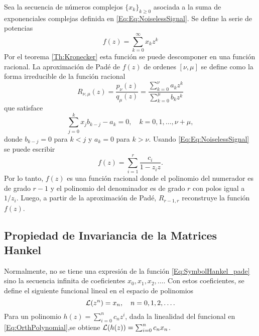             Sea la secuencia de números complejos $\big\{x_k\big\}_{k\ge 0}$ asociada a la suma de exponenciales complejas definida en \eqref{Eq:Eq:NoiselessSignal}. Se define la serie de potencias
            \begin{equation}
                f(z) = \sum_{k=0}^\infty x_kz^k
                \label{Eq:SymbolHankel_pade}
            \end{equation}
            Por el teorema \eqref{Th:Kronecker} esta función se puede descomponer en una función racional. La aproximación de Padé de $f(z)$ de ordenes $[\nu,\mu]$ se define como la forma irreducible de la función racional
		      \begin{equation}
		          R_{\nu,\mu}(z) = \frac{p_{\nu}(z)}{q_{\mu}(z)} =  \frac{\sum_{k=0}^{\nu}a_kz^k }{\sum_{k=0}^{\mu}b_kz^k}
		        \label{Eq:PadeApprox}
		      \end{equation} que satisface
		      \begin{equation}
		          \sum_{j=0}^{k}x_jb_{k-j}-a_k = 0, \quad k = 0,1,\ldots, \nu+\mu,
		          \label{Eq:PadeApprox1}
		      \end{equation}
		      donde $b_{k-j} = 0$ para $k<j$ y $a_k = 0$ para $k>\nu$. Usando
            \eqref{Eq:Eq:NoiselessSignal} se puede escribir
		      \begin{equation}
			         f(z) = \sum_{i=1}^r\frac{c_i}{1-z_iz}.
			         \label{Eq:PadeApprox2}
		      \end{equation}
		      Por lo tanto, $f(z)$ es una función racional donde el polinomio del numerador es de
            grado $r-1$ y el polinomio del denominador es de grado $r$ con polos igual a $1/z_i$. Luego, a partir de la aproximación de Padé, $R_{r-1,r}$ reconstruye la función $f(z)$.

        \subsection{Propiedad de Invariancia de la Matrices Hankel}
        
        	Normalmente, no se tiene una expresión de la función \eqref{Eq:SymbolHankel_pade} sino la secuencia infinita de coeficientes $x_0,x_1,x_2,\ldots$. Con estos coeficientes, se define el siguiente funcional lineal en el espacio de polinomios 
        	\begin{equation}
        		\mathcal{L}(z^n) = x_n, \quad n=0,1,2,\ldots.
        		\label{Eq:OrthPolynomial}
        	\end{equation}
        	Para un polinomio $h(z) = \sum_{i=0}^nc_nz^i$, dada la linealidad del funcional en \eqref{Eq:OrthPolynomial},se obtiene $\mathcal{L}(h(z)) = \sum_{i=0}^{n}c_nx_n$.
        	
